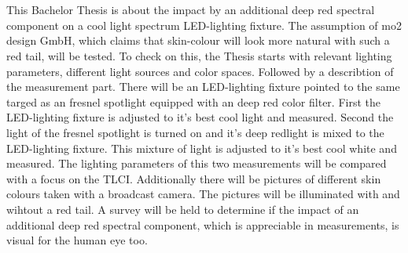 \section*{\centering\abstractname}
This Bachelor Thesis is about the impact by an additional deep red spectral component on a cool light spectrum LED-lighting fixture. The assumption of mo2 design GmbH, which claims that skin-colour will look more natural with such a \glqq red tail\grqq , will be tested. To check on this, the Thesis starts with relevant lighting parameters, different light sources and color spaces. Followed by a describtion of the measurement part. There will be an LED-lighting fixture pointed to the same targed as an fresnel spotlight equipped with an deep red color filter. First the LED-lighting fixture is adjusted to it's best cool light and measured. Second the light of the fresnel spotlight is turned on and it's deep redlight is mixed to the LED-lighting fixture. This mixture of light is adjusted to it's best cool white and measured. The lighting parameters of this two measurements will be compared with a focus on the TLCI.
Additionally there will be pictures of different skin colours taken with a broadcast camera. The pictures will be illuminated with and wihtout a \glqq red tail\grqq . A survey will be held to determine if the impact of an additional deep red spectral component, which is appreciable in measurements, is visual for the human eye too.
 
\section*{\centering\abstractname}

